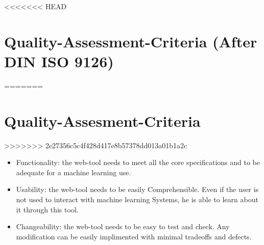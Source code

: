<<<<<<< HEAD
\section{Quality-Assessment-Criteria (After DIN ISO 9126)}
=======
\section{Quality-Assesment-Criteria }
>>>>>>> 2e27356c5c4f428d417e8b57378dd013a01b1a2c
%
\newpage

\begin{itemize}
  \item  Functionality: the web-tool needs to meet all the core specifications and to be adequate for a machine learning use.
  \item  Usability: the web-tool needs to be easily Comprehensible. Even if the user is not used to interact with machine learning Systems, he is able to learn about it through this tool.
 \item   Changeability: the web-tool needs to be easy to test and check. Any modification can be easily implimented with minimal tradeoffs and defects.
\end{itemize}



   
    